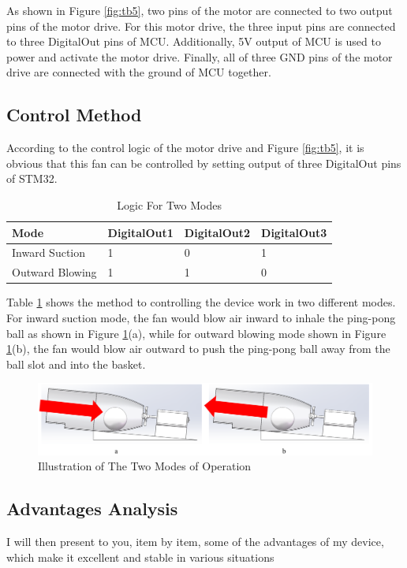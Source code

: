 \documentclass[12pt, a4paper, oneside]{report}
\begin{document}
As shown in Figure \ref{fig:tb5}, two pins of the motor are connected to two output pins of the motor drive. For this motor drive, the three input pins are connected to three DigitalOut pins of MCU. Additionally, 5V output of MCU is used to power and activate the motor drive. Finally, all of three GND pins of the motor drive are connected with the ground of MCU together.

\subsection{Control Method}

According to the control logic of the motor drive and Figure \ref{fig:tb5}, it is obvious that this fan can be controlled by setting output of three DigitalOut pins of STM32.

\begin{table}[H]
    \centering
    \begin{tabular}{|l|l|l|l|}
    \hline
        Mode & DigitalOut1 & DigitalOut2 & DigitalOut3 \\ \hline
        Inward Suction  & 1 & 0 & 1 \\ \hline
        Outward Blowing  & 1 & 1 & 0 \\ \hline
    \end{tabular}
    \caption{Logic For Two Modes}
    \label{tab:tb1}
\end{table}

Table \ref{tab:tb1} shows the method to controlling the device work in two different modes. For inward suction mode, the fan would blow air inward to inhale the ping-pong ball as shown in Figure \ref{fig:tb6}(a), while for outward blowing mode shown in Figure \ref{fig:tb6}(b), the fan would blow air outward to push the ping-pong ball away from the ball slot and into the basket.

\begin{figure}[H]
  \centering
  \includegraphics[width=1\textwidth]{pic/Table tennis/14.png}
  \caption{Illustration of The Two Modes of Operation}
  \label{fig:tb6}
\end{figure}

\newpage
\subsection{Advantages Analysis}
I will then present to you, item by item, some of the advantages of my device, which make it excellent and stable in various situations
\end{document}

